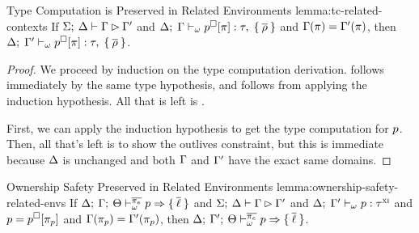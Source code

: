 \begin{oxlemma}{Type Computation is Preserved in Related Environments}
  {lemma:tc-related-contexts} If $\Sigma; \: \Delta \vdash \Gamma \rhd \Gamma^\prime$ and
  $ \Delta; \; \Gamma \vdash_{\omega} p^\square[\pi] : \tau, \; \{ \: \overline{\rho} \: \} $
  and $\Gamma(\pi) = \Gamma^\prime(\pi)$, then
  $ \Delta; \; \Gamma^\prime \vdash_{\omega} p^\square[\pi] : \tau, \; \{ \: \overline{\rho} \: \} $.
\end{oxlemma}
\begin{proof}
  We proceed by induction on the type computation derivation. 
  follows immediately by the same type hypothesis, and  follows
  from applying the induction hypothesis. All that is left is .

  \vspace{1em}
  \noindent \framebox[\textwidth]{ \figuresize
    \begin{mathpar}
      \TCDeref
    \end{mathpar}
  } \vspace{1em}

  First, we can apply the induction hypothesis to get the type computation for
  $p$. Then, all that's left is to show the outlives constraint, but
  this is immediate because $\Delta$ is unchanged and both $\Gamma$ and
  $\Gamma^\prime$ have the exact same domains.

\end{proof}

\begin{oxlemma}{Ownership Safety Preserved in Related Environments}
  {lemma:ownership-safety-related-envs} If
  $\Delta; \: \Gamma; \: \Theta \vdash^{\overline{\pi_e}}_{\omega} p \Rightarrow \{ \: \overline{\ell} \: \}$ and
  $\Sigma; \: \Delta \vdash \Gamma \rhd \Gamma^\prime$ and
  $ \Delta; \; \Gamma^\prime \vdash_{\omega} p : \tau^\textsc{xi} $
  and $p = p^\square[\pi_p]$ and
  $\Gamma(\pi_p) = \Gamma^\prime(\pi_p)$,
  then
  $\Delta; \: \Gamma^\prime; \: \Theta \vdash^{\overline{\pi_e}}_{\omega} p \Rightarrow \{ \: \overline{\ell} \: \}$.
\end{oxlemma}

